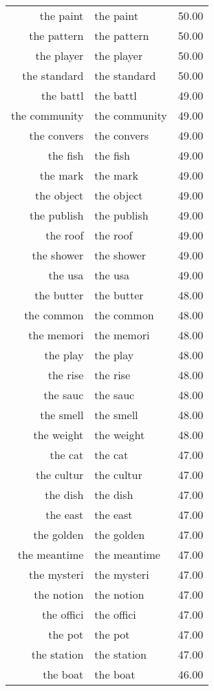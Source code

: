 \begin{table}[ht]
\begin{tabular}{rlr}
  the paint & the paint & 50.00 \\ 
  the pattern & the pattern & 50.00 \\ 
  the player & the player & 50.00 \\ 
  the standard & the standard & 50.00 \\ 
  the battl & the battl & 49.00 \\ 
  the community & the community & 49.00 \\ 
  the convers & the convers & 49.00 \\ 
  the fish & the fish & 49.00 \\ 
  the mark & the mark & 49.00 \\ 
  the object & the object & 49.00 \\ 
  the publish & the publish & 49.00 \\ 
  the roof & the roof & 49.00 \\ 
  the shower & the shower & 49.00 \\ 
  the usa & the usa & 49.00 \\ 
  the butter & the butter & 48.00 \\ 
  the common & the common & 48.00 \\ 
  the memori & the memori & 48.00 \\ 
  the play & the play & 48.00 \\ 
  the rise & the rise & 48.00 \\ 
  the sauc & the sauc & 48.00 \\ 
  the smell & the smell & 48.00 \\ 
  the weight & the weight & 48.00 \\ 
  the cat & the cat & 47.00 \\ 
  the cultur & the cultur & 47.00 \\ 
  the dish & the dish & 47.00 \\ 
  the east & the east & 47.00 \\ 
  the golden & the golden & 47.00 \\ 
  the meantime & the meantime & 47.00 \\ 
  the mysteri & the mysteri & 47.00 \\ 
  the notion & the notion & 47.00 \\ 
  the offici & the offici & 47.00 \\ 
  the pot & the pot & 47.00 \\ 
  the station & the station & 47.00 \\ 
  the boat & the boat & 46.00 \\ 

\end{tabular}
\end{table}
